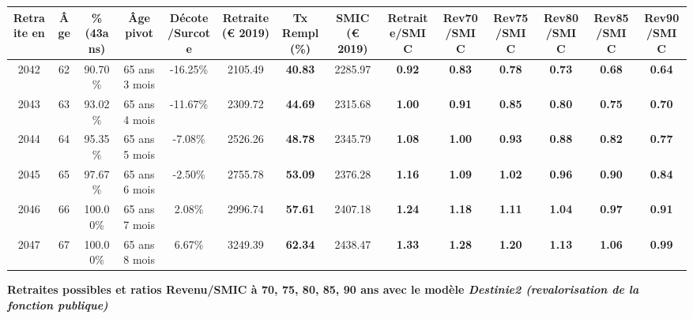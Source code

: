 \begin{adjustbox}{max width=\textwidth} 
\begin{tabular}[htb]{|c|c||c|c|c||c|c||c||c|c|c|c|c|c|} 
\hline 
 Retraite en &  Âge &  \%(43ans) &  Âge pivot &  Décote/Surcote &  Retraite (\euro{} 2019) &  Tx Rempl(\%) &  SMIC (\euro{} 2019) &  Retraite/SMIC &  Rev70/SMIC &  Rev75/SMIC &  Rev80/SMIC &  Rev85/SMIC &  Rev90/SMIC \\ 
\hline \hline 
 2042 &  62 &  90.70\% &  65 ans 3 mois &  -16.25\% &  2105.49 &  {\bf 40.83} &  2285.97 &  {\bf {\color{red} 0.92}} &  {\bf {\color{red} 0.83}} &  {\bf {\color{red} 0.78}} &  {\bf {\color{red} 0.73}} &  {\bf {\color{red} 0.68}} &  {\bf {\color{red} 0.64}} \\ 
\hline 
 2043 &  63 &  93.02\% &  65 ans 4 mois &  -11.67\% &  2309.72 &  {\bf 44.69} &  2315.68 &  {\bf {\color{red} 1.00}} &  {\bf {\color{red} 0.91}} &  {\bf {\color{red} 0.85}} &  {\bf {\color{red} 0.80}} &  {\bf {\color{red} 0.75}} &  {\bf {\color{red} 0.70}} \\ 
\hline 
 2044 &  64 &  95.35\% &  65 ans 5 mois &  -7.08\% &  2526.26 &  {\bf 48.78} &  2345.79 &  {\bf 1.08} &  {\bf {\color{red} 1.00}} &  {\bf {\color{red} 0.93}} &  {\bf {\color{red} 0.88}} &  {\bf {\color{red} 0.82}} &  {\bf {\color{red} 0.77}} \\ 
\hline 
 2045 &  65 &  97.67\% &  65 ans 6 mois &  -2.50\% &  2755.78 &  {\bf 53.09} &  2376.28 &  {\bf 1.16} &  {\bf 1.09} &  {\bf 1.02} &  {\bf {\color{red} 0.96}} &  {\bf {\color{red} 0.90}} &  {\bf {\color{red} 0.84}} \\ 
\hline 
 2046 &  66 &  100.00\% &  65 ans 7 mois &  2.08\% &  2996.74 &  {\bf 57.61} &  2407.18 &  {\bf 1.24} &  {\bf 1.18} &  {\bf 1.11} &  {\bf 1.04} &  {\bf {\color{red} 0.97}} &  {\bf {\color{red} 0.91}} \\ 
\hline 
 2047 &  67 &  100.00\% &  65 ans 8 mois &  6.67\% &  3249.39 &  {\bf 62.34} &  2438.47 &  {\bf 1.33} &  {\bf 1.28} &  {\bf 1.20} &  {\bf 1.13} &  {\bf 1.06} &  {\bf {\color{red} 0.99}} \\ 
\hline 
\hline 
\end{tabular} 
\end{adjustbox} 
 
 \vspace{0.1cm} 
{\bf \noindent Retraites possibles et ratios Revenu/SMIC à 70, 75, 80, 85, 90 ans avec le modèle \emph{Destinie2 (revalorisation de la fonction publique)}}  
 
